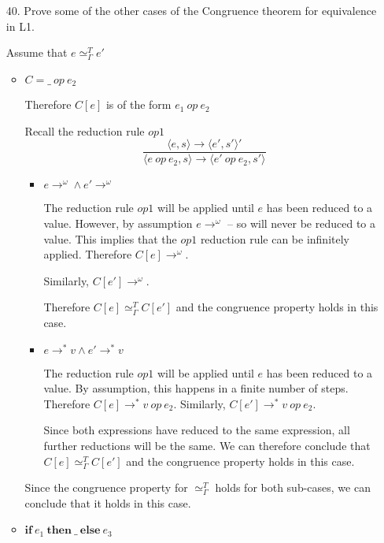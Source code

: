 \documentclass[10pt,\jkfside,a4paper]{article}
\begin{document}
\begin{enumerate}

\item [40.] Prove some of the other cases of the Congruence theorem for
equivalence in L1.

Assume that $e \simeq_\Gamma^T e'$

\begin{itemize}[label=\textbf{case}]

\item $C = \_ \ op \ e_2$

Therefore $C[e]$ is of the form $e_1 \ op \ e_2$

Recall the reduction rule $op1$
\[
\dfrac{
\langle e, s \rangle \to \langle e', s' \rangle'
}{
\langle e \ op \ e_2, s \rangle \to \langle e' \ op \ e_2, s' \rangle
}
\]

\begin{itemize}[label=\textbf{case}]

\item $e \to^\omega \wedge e' \to^\omega$

The reduction rule $op1$ will be applied until $e$ has been reduced to a
value. However, by assumption $e \to^\omega$ -- so will never be
reduced to a value. This implies that the $op1$ reduction rule can be
infinitely applied. Therefore $C[e] \to^\omega$.

Similarly, $C[e']\to^\omega$.

Therefore $C[e] \simeq^T_\Gamma C[e']$ and the congruence property holds in
this case.

\item $e \to^* v \wedge e' \to^* v$

The reduction rule $op1$ will be applied until $e$ has been reduced to a
value. By assumption, this happens in a finite number of steps. Therefore
$C[e] \to^* v \ op \ e_2$. Similarly, $C[e'] \to^* v \ op \ e_2$.

Since both expressions have reduced to the same expression, all further
reductions will be the same. We can therefore conclude that $C[e]
\simeq^T_\Gamma C[e']$ and the congruence property holds in this case.

\end{itemize}

Since the congruence property for $\simeq^T_\Gamma$ holds for both sub-cases,
we can conclude that it holds in this case.

\item $\mathbf{if} \ e_1 \ \mathbf{then} \ \_ \ \mathbf{else} \ e_3$


\end{itemize}
\end{enumerate}
\end{document}
